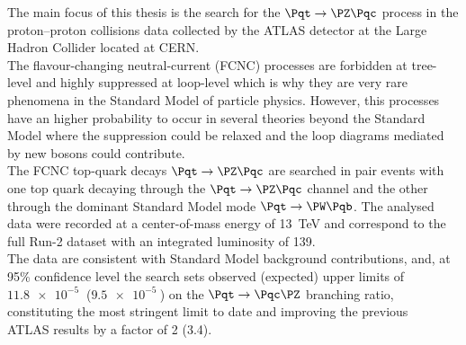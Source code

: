 \begin{adjustwidth}{1.5cm}{1.5cm}
	The main focus of this thesis is the search for the $\Pqt\rightarrow\PZ\Pqc$ process in the 
	proton–proton collisions data collected by the ATLAS detector at 
	the Large Hadron Collider located at CERN.\\		
	The flavour-changing neutral-current (FCNC) processes are forbidden at tree-level and 
	highly suppressed at loop-level which is why they are very rare phenomena in the Standard Model of particle physics.
	However, this processes have an higher probability to occur in several theories beyond the Standard Model where the 
	suppression could be relaxed and the loop diagrams mediated by new bosons could contribute.\\	
	The FCNC top-quark decays $\mathrm{\Pqt\rightarrow\PZ\Pqc}$ are searched in 
	\ttbar pair events with one top quark decaying through the $\mathrm{\Pqt\rightarrow\PZ\Pqc}$ channel 
	and the other through the dominant Standard Model mode $\mathrm{\Pqt\rightarrow\PW\Pqb}$.
	The analysed data were recorded at a center-of-mass energy of \SI{13}{\TeV} and correspond to the full Run-2 dataset 
	with an integrated luminosity of \SI{139}{\ifb}.\\
	The data are consistent with Standard Model background contributions, and, at 95\% confidence level the search sets observed (expected) upper limits of $\mathrm{\SI{11.8e-5}{}}$ ($\mathrm{\SI{9.5e-5}{}}$) on the $\mathrm{\Pqt\rightarrow\Pqc\PZ}$ branching ratio, constituting the most stringent limit to date and improving the previous\\ ATLAS results by a factor of 2 (3.4).
		
\end{adjustwidth}



